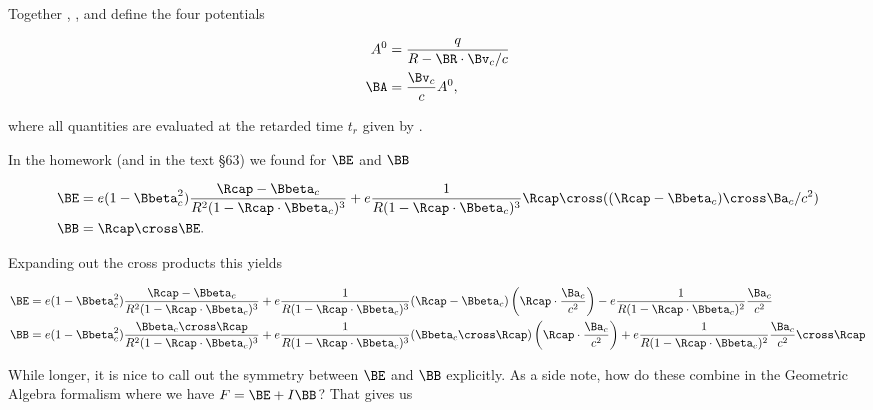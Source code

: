 {Together , , and  define the four potentials

\begin{equation}\label{eqn:relativisticElectrodynamicsExamReflection:910}
\begin{aligned}
A^0 &= \frac{q}{R - \BR \cdot \Bv_c/c} \\
\BA &= \frac{\Bv_c}{c} A^0,
\end{aligned}
\end{equation}

where all quantities are evaluated at the retarded time $t_r$ given by .

In the homework (and in the text \citep{landau1980classical} \S 63) we found for $\BE$ and $\BB$

\begin{equation}\label{eqn:relativisticElectrodynamicsExamReflection:920}
\begin{aligned}
\BE &= e (1 - \Bbeta_c^2) \frac{\Rcap - \Bbeta_c}{R^2 (1 - \Rcap \cdot \Bbeta_c)^3}
+ e \frac{1}{R (1 - \Rcap \cdot \Bbeta_c)^3} \Rcap \cross ((\Rcap - \Bbeta_c) \cross \Ba_c/c^2) \\
\BB &= \Rcap \cross \BE.
\end{aligned}
\end{equation}

Expanding out the cross products this yields

\begin{equation}\label{eqn:relativisticElectrodynamicsExamReflection:930}
\begin{aligned}
\BE 
&= e (1 - \Bbeta_c^2) \frac{\Rcap - \Bbeta_c}{R^2 (1 - \Rcap \cdot \Bbeta_c)^3}
+ e \frac{1}{R (1 - \Rcap \cdot \Bbeta_c)^3} (\Rcap - \Bbeta_c) \left(\Rcap \cdot \frac{\Ba_c}{c^2}\right)
- e \frac{1}{R (1 - \Rcap \cdot \Bbeta_c)^2} \frac{\Ba_c}{c^2} \\
\BB 
&= e (1 - \Bbeta_c^2) \frac{\Bbeta_c \cross \Rcap}{R^2 (1 - \Rcap \cdot \Bbeta_c)^3}
+ e \frac{1}{R (1 - \Rcap \cdot \Bbeta_c)^3} (\Bbeta_c \cross \Rcap) \left(\Rcap \cdot \frac{\Ba_c}{c^2} \right)
+ e \frac{1}{R (1 - \Rcap \cdot \Bbeta_c)^2} \frac{\Ba_c}{c^2} \cross \Rcap
\end{aligned}
\end{equation}

While longer, it is nice to call out the symmetry between $\BE$ and $\BB$ explicitly.  As a side note, how do these combine in the Geometric Algebra formalism where we have $F = \BE + I\BB$?  That gives us

}
